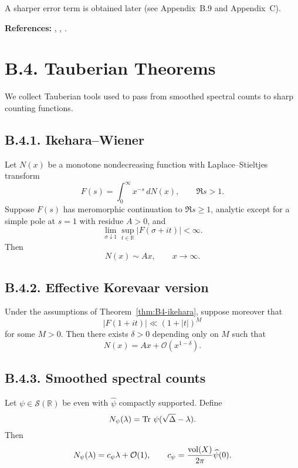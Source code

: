 \begin{remark}
A sharper error term is obtained later (see Appendix~B.9 and Appendix~C).
\end{remark}

\medskip
\noindent\textbf{References:}
\cite{Sogge}, \cite{Zworski}, \cite{HejhalI,HejhalII}.

\section{B.4. Tauberian Theorems}\label{sec:B4}

We collect Tauberian tools used to pass from smoothed spectral counts to sharp counting functions.

\subsection*{B.4.1. Ikehara--Wiener}

\begin{theorem}\label{thm:B4-ikehara}
Let $N(x)$ be a monotone nondecreasing function with Laplace--Stieltjes transform
\[
F(s)=\int_0^\infty x^{-s}\,dN(x),\qquad \Re s>1.
\]
Suppose $F(s)$ has meromorphic continuation to $\Re s\ge 1$, analytic except for a simple pole at $s=1$ with residue $A>0$, and
\[
\lim_{\sigma\downarrow 1}\sup_{t\in\mathbb{R}} |F(\sigma+it)|<\infty.
\]
Then
\[
N(x)\sim Ax,\qquad x\to\infty.
\]
\end{theorem}

\subsection*{B.4.2. Effective Korevaar version}

\begin{theorem}[Korevaar]\label{thm:B4-korevaar}
Under the assumptions of Theorem~\ref{thm:B4-ikehara}, suppose moreover that
\[
|F(1+it)|\ll (1+|t|)^M
\]
for some $M>0$. Then there exists $\delta>0$ depending only on $M$ such that
\begin{equation}\label{eq:B4-korevaar}
N(x)=Ax+\mathcal{O}(x^{1-\delta}).
\end{equation}
\end{theorem}

\subsection*{B.4.3. Smoothed spectral counts}

\begin{lemma}\label{lem:B4-smooth}
Let $\psi\in \mathcal{S}(\mathbb{R})$ be even with $\widehat{\psi}$ compactly supported.
Define
\[
N_\psi(\lambda)=\operatorname{Tr}\,\psi(\sqrt{\Delta}-\lambda).
\]
Then
\[
N_\psi(\lambda)=c_\psi\lambda+\mathcal{O}(1),
\qquad
c_\psi=\frac{\operatorname{vol}(X)}{2\pi}\widehat\psi(0).
\]
\end{lemma}

